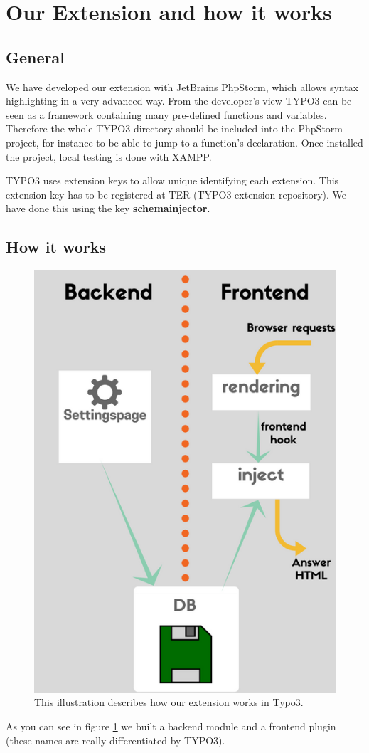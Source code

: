 \documentclass[12pt]{article}
\begin{document}
\section{Our Extension and how it works}
\subsection{General}

We have developed our extension with JetBrains PhpStorm, which allows syntax highlighting in a very advanced way. From the developer's view TYPO3 can be seen as a framework containing many pre-defined functions and variables. Therefore the whole TYPO3 directory should be included into the PhpStorm project, for instance to be able to jump to a function's declaration. Once installed the project, local testing is done with XAMPP.

TYPO3 uses extension keys to allow unique identifying each extension. This extension key has to be registered at TER (TYPO3 extension repository). We have done this using the key \textbf{schema\textunderscore injector}.

\subsection{How it works}
\begin{figure}[ht]
	\centering
	\includegraphics[height=0.75\textwidth]{work_flow.png}
	\caption{This illustration describes how our extension works in Typo3.}
	\label{work_flow}
\end{figure}
As you can see in figure \ref{work_flow} we built a backend module and a frontend plugin (these names are really differentiated by TYPO3).
\end{document}
